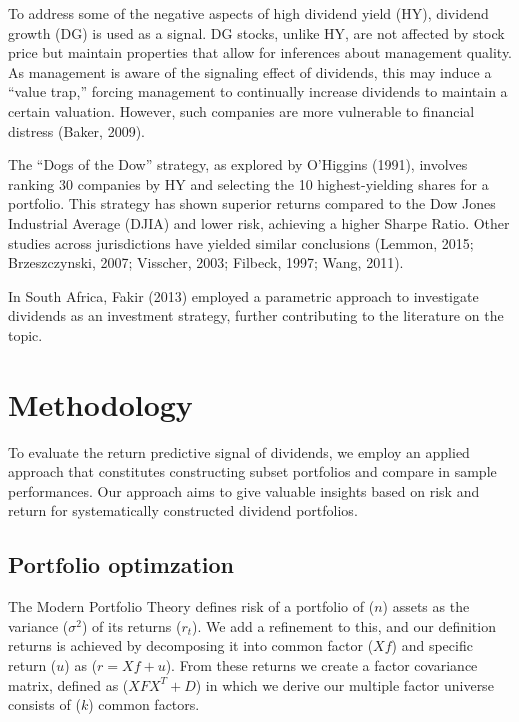 \documentclass[11pt,preprint, authoryear]{elsarticle}
\numberwithin{equation}{section}
\numberwithin{figure}{section}
\numberwithin{table}{section}
\begin{document}
To address some of the negative aspects of high dividend yield (HY),
dividend growth (DG) is used as a signal. DG stocks, unlike HY, are not
affected by stock price but maintain properties that allow for
inferences about management quality. As management is aware of the
signaling effect of dividends, this may induce a ``value trap,'' forcing
management to continually increase dividends to maintain a certain
valuation. However, such companies are more vulnerable to financial
distress (Baker, 2009).

The ``Dogs of the Dow'' strategy, as explored by O'Higgins (1991),
involves ranking 30 companies by HY and selecting the 10
highest-yielding shares for a portfolio. This strategy has shown
superior returns compared to the Dow Jones Industrial Average (DJIA) and
lower risk, achieving a higher Sharpe Ratio. Other studies across
jurisdictions have yielded similar conclusions (Lemmon, 2015;
Brzeszczynski, 2007; Visscher, 2003; Filbeck, 1997; Wang, 2011).

In South Africa, Fakir (2013) employed a parametric approach to
investigate dividends as an investment strategy, further contributing to
the literature on the topic.

\hypertarget{methodology}{%
\section*{Methodology}\label{methodology}}

To evaluate the return predictive signal of dividends, we employ an
applied approach that constitutes constructing subset portfolios and
compare in sample performances. Our approach aims to give valuable
insights based on risk and return for systematically constructed
dividend portfolios.

\hypertarget{portfolio-optimzation}{%
\subsection*{Portfolio optimzation}\label{portfolio-optimzation}}

The Modern Portfolio Theory defines risk of a portfolio of (\(n\))
assets as the variance (\(\sigma^2\)) of its returns (\(r_{t}\)). We add
a refinement to this, and our definition returns is achieved by
decomposing it into common factor (\(Xf\)) and specific return (\(u\))
as (\(r = Xf+ u\)). From these returns we create a factor covariance
matrix, defined as (\(X F X^T+D\)) in which we derive our multiple
factor universe consists of (\(k\)) common factors.
\end{document}
